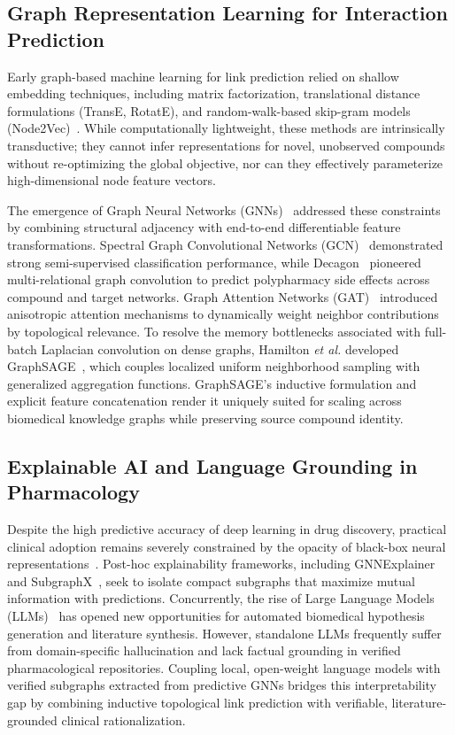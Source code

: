 \documentclass[preprint,12pt]{elsarticle}
\begin{document}
\subsection{Graph Representation Learning for Interaction Prediction}
Early graph-based machine learning for link prediction relied on shallow embedding techniques, including matrix factorization, translational distance formulations (TransE, RotatE), and random-walk-based skip-gram models (Node2Vec)~\cite{ref18}. While computationally lightweight, these methods are intrinsically transductive; they cannot infer representations for novel, unobserved compounds without re-optimizing the global objective, nor can they effectively parameterize high-dimensional node feature vectors.

The emergence of Graph Neural Networks (GNNs)~\cite{ref4} addressed these constraints by combining structural adjacency with end-to-end differentiable feature transformations. Spectral Graph Convolutional Networks (GCN)~\cite{ref2} demonstrated strong semi-supervised classification performance, while Decagon~\cite{ref24} pioneered multi-relational graph convolution to predict polypharmacy side effects across compound and target networks. Graph Attention Networks (GAT)~\cite{ref_gat} introduced anisotropic attention mechanisms to dynamically weight neighbor contributions by topological relevance. To resolve the memory bottlenecks associated with full-batch Laplacian convolution on dense graphs, Hamilton \textit{et al.} developed GraphSAGE~\cite{ref1}, which couples localized uniform neighborhood sampling with generalized aggregation functions. GraphSAGE's inductive formulation and explicit feature concatenation render it uniquely suited for scaling across biomedical knowledge graphs while preserving source compound identity.

\subsection{Explainable AI and Language Grounding in Pharmacology}
Despite the high predictive accuracy of deep learning in drug discovery, practical clinical adoption remains severely constrained by the opacity of black-box neural representations~\cite{ref4}. Post-hoc explainability frameworks, including GNNExplainer~\cite{ref_gnnexplainer} and SubgraphX~\cite{ref_subgraphx}, seek to isolate compact subgraphs that maximize mutual information with predictions. Concurrently, the rise of Large Language Models (LLMs)~\cite{ref_llama} has opened new opportunities for automated biomedical hypothesis generation and literature synthesis. However, standalone LLMs frequently suffer from domain-specific hallucination and lack factual grounding in verified pharmacological repositories. Coupling local, open-weight language models with verified subgraphs extracted from predictive GNNs bridges this interpretability gap by combining inductive topological link prediction with verifiable, literature-grounded clinical rationalization.
\end{document}
